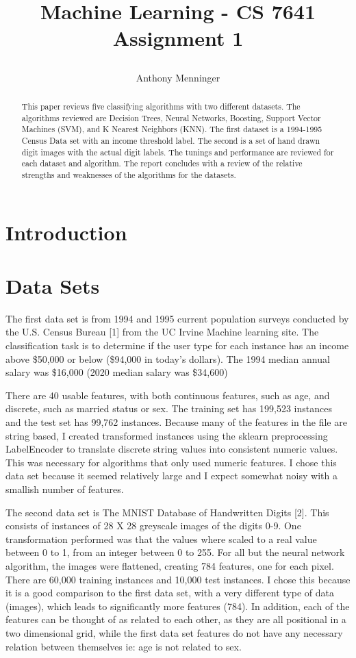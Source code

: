 \documentclass[letterpaper]{article} %
\title{
Machine Learning - CS 7641 \\
Assignment 1
	
}
\author {
    Anthony Menninger \\
}
\begin{document}
\maketitle

\begin{abstract}
This paper reviews five classifying algorithms with two different datasets. The algorithms reviewed are Decision Trees, Neural Networks, Boosting, Support Vector Machines (SVM), and K Nearest Neighbors (KNN).  The first dataset is a 1994-1995 Census Data set with an income threshold label.  The second is a set of hand drawn digit images with the actual digit labels.  The tunings and performance are reviewed for each dataset and algorithm.  The report concludes with a review of the relative strengths and weaknesses of the algorithms for the datasets.
\end{abstract}

\section{Introduction}


\section{Data Sets}

The first data set is from 1994 and 1995 current population surveys conducted by the U.S. Census Bureau [1] from the UC Irvine Machine learning site.  The classification task is to determine if the user type for each instance has an income above \$50,000 or below (\$94,000 in today's dollars).  The 1994 median annual salary was \$16,000 (2020 median salary was \$34,600) 

There are 40 usable features, with both continuous features, such as age, and discrete, such as married status or sex.  The training set has 199,523 instances and the test set has 99,762 instances.  Because many of the features in the file are string based, I created transformed instances using the sklearn preprocessing LabelEncoder to translate discrete string values into consistent numeric values.  This was necessary for algorithms that only used numeric features. I chose this data set because it seemed relatively large and I expect somewhat noisy with a smallish number of features.  

The second data set is The MNIST Database of Handwritten Digits [2].  This consists of instances of 28 X 28 greyscale images of the digits 0-9.  One transformation performed was that the values where scaled to a real value between 0 to 1, from an integer between 0 to 255.  For all but the neural network algorithm,  the images were flattened, creating 784 features, one for each pixel.  There are 60,000 training instances and 10,000 test instances.  I chose this because it is a good comparison to the first data set, with a very different type of data (images), which leads to significantly more features (784).  In addition, each of the features can be thought of as related to each other, as they are all positional in a two dimensional grid, while the first data set features do not have any necessary relation between themselves ie:  age is not related to sex.  
\end{document}
